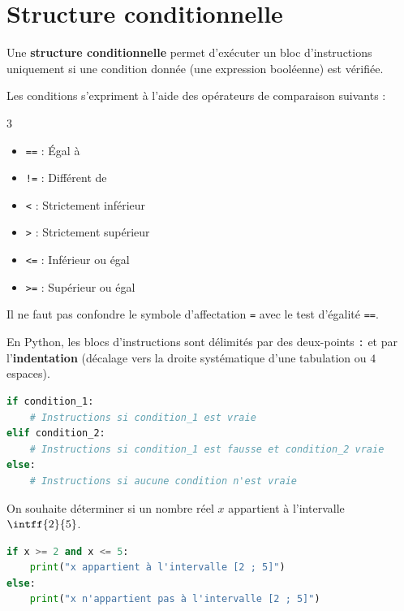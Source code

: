 \section{Structure conditionnelle}

\begin{defin}
	Une \textbf{structure conditionnelle} permet d'exécuter un bloc d'instructions uniquement si une condition donnée (une expression booléenne) est vérifiée.
\end{defin}

\begin{prop}
	Les conditions s'expriment à l'aide des opérateurs de comparaison suivants :
	\begin{multicols}{3}
		\begin{itemize}
			\item \lstinline|==| : Égal à
			\item \lstinline|!=| : Différent de
			\item \lstinline|<| : Strictement inférieur
			\item \lstinline|>| : Strictement supérieur
			\item \lstinline|<=| : Inférieur ou égal
			\item \lstinline|>=| : Supérieur ou égal
		\end{itemize}
	\end{multicols}
\end{prop}

\begin{attention}
	Il ne faut pas confondre le symbole d'affectation \lstinline|=| avec le test d'égalité \lstinline|==|.
\end{attention}

\begin{defin}
	En Python, les blocs d'instructions sont délimités par des deux-points \lstinline|:| et par l'\textbf{indentation} (décalage vers la droite systématique d'une tabulation ou $4$ espaces).

	\begin{lstlisting}[language=Python]
if condition_1:
    # Instructions si condition_1 est vraie
elif condition_2:
    # Instructions si condition_1 est fausse et condition_2 vraie
else:
    # Instructions si aucune condition n'est vraie
\end{lstlisting}
\end{defin}

\begin{methode}
	On souhaite déterminer si un nombre réel $x$ appartient à l'intervalle $\intff{2}{5}$.

	\begin{correction}
		\nline
		\begin{lstlisting}[language=Python]
if x >= 2 and x <= 5:
    print("x appartient à l'intervalle [2 ; 5]")
else:
    print("x n'appartient pas à l'intervalle [2 ; 5]")
\end{lstlisting}
	\end{correction}
\end{methode}

